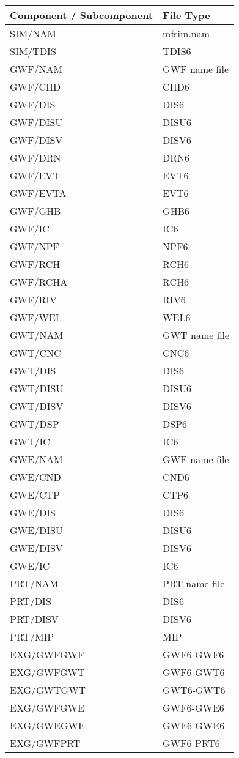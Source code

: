 \begin{table}[H]
\caption{Components and subcomponents that are read using Input Data Processor (IDP) routines}
\small
\begin{center}
\begin{longtable}{p{6cm} p{4cm}}
\hline
\hline
\textbf{Component / Subcomponent} & \textbf{File Type} \\
\hline
SIM/NAM & mfsim.nam \\
SIM/TDIS & TDIS6 \\
\hline
GWF/NAM & GWF name file \\
GWF/CHD & CHD6 \\
GWF/DIS & DIS6 \\
GWF/DISU & DISU6 \\
GWF/DISV & DISV6 \\
GWF/DRN & DRN6 \\
GWF/EVT & EVT6 \\
GWF/EVTA & EVT6 \\
GWF/GHB & GHB6 \\
GWF/IC & IC6 \\
GWF/NPF & NPF6 \\
GWF/RCH & RCH6 \\
GWF/RCHA & RCH6 \\
GWF/RIV & RIV6 \\
GWF/WEL & WEL6 \\
\hline
GWT/NAM & GWT name file \\
GWT/CNC & CNC6 \\
GWT/DIS & DIS6 \\
GWT/DISU & DISU6 \\
GWT/DISV & DISV6 \\
GWT/DSP & DSP6 \\
GWT/IC & IC6 \\
\hline
GWE/NAM & GWE name file \\
GWE/CND & CND6 \\
GWE/CTP & CTP6 \\
GWE/DIS & DIS6 \\ 
GWE/DISU & DISU6 \\
GWE/DISV & DISV6 \\
GWE/IC & IC6 \\
\hline
PRT/NAM & PRT name file \\
PRT/DIS & DIS6 \\ 
PRT/DISV & DISV6 \\
PRT/MIP & MIP \\
\hline
EXG/GWFGWF & GWF6-GWF6 \\
EXG/GWFGWT & GWF6-GWT6 \\
EXG/GWTGWT & GWT6-GWT6 \\
EXG/GWFGWE & GWF6-GWE6 \\
EXG/GWEGWE & GWE6-GWE6 \\
EXG/GWFPRT & GWF6-PRT6 \\
\hline
\end{longtable}
\label{table:idmsupported}
\end{center}
\normalsize
\end{table}

